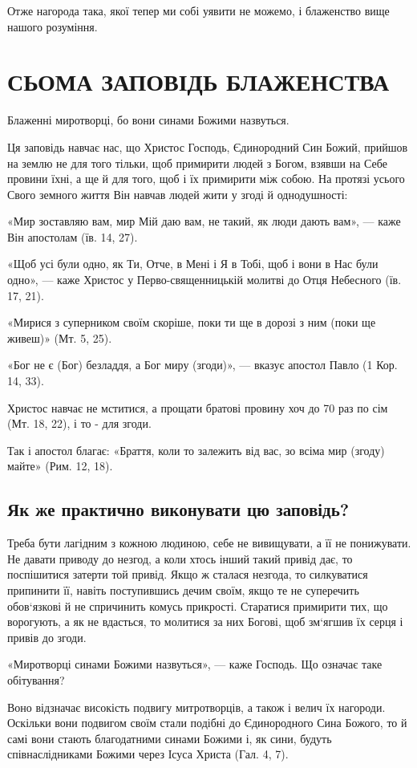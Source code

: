\documentclass[main.tex]{subfiles}
\begin{document}
Отже нагорода така, якої тепер ми собі уявити не можемо, і блаженство вище нашого розуміння.

\section{СЬОМА ЗАПОВІДЬ БЛАЖЕНСТВА}

Блаженні миротворці, бо вони синами Божими назвуться.

Ця заповідь навчає нас, що Христос Господь, Єдинородний Син Божий, прийшов на землю не для того тільки, щоб примирити людей з Богом, взявши на Себе провини їхні, а ще й для того, щоб і їх примирити між собою. На протязі усього Свого земного життя Він навчав людей жити у згоді й однодушності:

«Мир зоставляю вам, мир Мій даю вам, не такий, як люди дають вам», — каже Він апостолам (їв. 14, 27).

«Щоб усі були одно, як Ти, Отче, в Мені і Я в Тобі, щоб і вони в Нас були одно», — каже Христос у Перво-священницькій молитві до Отця Небесного (їв. 17, 21).

«Мирися з суперником своїм скоріше, поки ти ще в дорозі з ним (поки ще живеш)» (Мт. 5, 25).

«Бог не є (Бог) безладдя, а Бог миру (згоди)», — вказує апостол Павло (1 Кор. 14, 33).

Христос навчає не мститися, а прощати братові провину хоч до 70 раз по сім (Мт. 18, 22), і то - для згоди.

Так і апостол благає: «Браття, коли то залежить від вас, зо всіма мир (згоду) майте» (Рим. 12, 18).

\subsection{Як же практично виконувати цю заповідь?}

Треба бути лагідним з кожною людиною, себе не вивищувати, а її не понижувати. Не давати приводу до незгод, а коли хтось інший такий привід дає, то поспішитися затерти той привід. Якщо ж сталася незгода, то силкуватися припинити її, навіть поступившись дечим своїм, якщо те не суперечить обов`язкові й не спричинить комусь прикрості. Старатися примирити тих, що ворогують, а як не вдасться, то молитися за них Богові, щоб зм`ягшив їх серця і привів до згоди.

«Миротворці синами Божими назвуться», — каже Господь. Що означає таке обітування?

Воно відзначає високість подвигу митротворців, а також і велич їх нагороди. Оскільки вони подвигом своїм стали подібні до Єдинородного Сина Божого, то й самі вони стають благодатними синами Божими і, як сини, будуть співнаслідниками Божими через Ісуса Христа (Гал. 4, 7).
\end{document}

